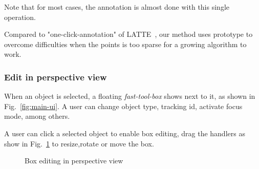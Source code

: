\documentclass[letterpaper, 10 pt, conference]{ieeeconf}  %
\begin{document}
Note that for most cases, the annotation is almost done with this single operation.

Compared to "one-click-annotation" of LATTE~\cite{pointatme}, our method uses prototype to overcome difficulties when the points is too sparse for a growing algorithm to work.

\subsubsection{Edit in perspective view}

When an object is selected, a floating \emph{fast-tool-box} shows next to it, as shown in Fig.~\ref{fig:main-ui}. A user can change object type, tracking id, activate focus mode, among others.

A user can click a selected object to enable box editing, drag the handlers as show in Fig.~\ref{fig:box-mouse-edit} to resize,rotate or move the box.
 

\begin{figure}[t]
	\centering
	\caption{Box editing in perspective view}
	\label{fig:box-mouse-edit}
\end{figure}
\end{document}

